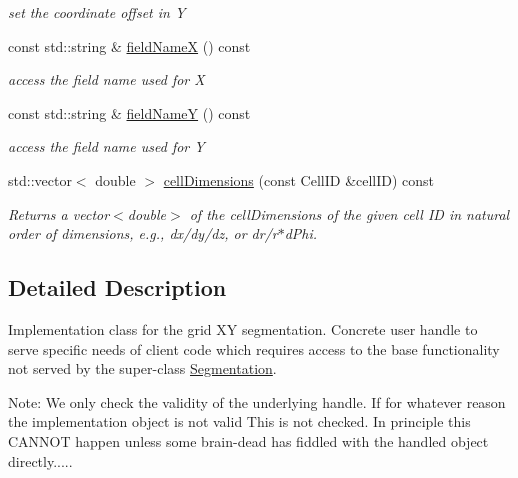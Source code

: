\begin{DoxyCompactItemize}
\begin{DoxyCompactList}\small\item\em set the coordinate offset in Y \item\end{DoxyCompactList}\item 
const std::string \& \hyperlink{class_d_d4hep_1_1_geometry_1_1_cartesian_grid_x_y_aa112adb69e3956f7a576f0de3267b499}{fieldNameX} () const 
\begin{DoxyCompactList}\small\item\em access the field name used for X \item\end{DoxyCompactList}\item 
const std::string \& \hyperlink{class_d_d4hep_1_1_geometry_1_1_cartesian_grid_x_y_a6599c502c4e9628911615308e4581f1c}{fieldNameY} () const 
\begin{DoxyCompactList}\small\item\em access the field name used for Y \item\end{DoxyCompactList}\item 
std::vector$<$ double $>$ \hyperlink{class_d_d4hep_1_1_geometry_1_1_cartesian_grid_x_y_a2f04ec459749d9b0498fbf4601d19a20}{cellDimensions} (const CellID \&cellID) const 
\begin{DoxyCompactList}\small\item\em Returns a vector$<$double$>$ of the cellDimensions of the given cell ID in natural order of dimensions, e.g., dx/dy/dz, or dr/r$\ast$dPhi. \item\end{DoxyCompactList}\end{DoxyCompactItemize}


\subsection{Detailed Description}
Implementation class for the grid XY segmentation. Concrete user handle to serve specific needs of client code which requires access to the base functionality not served by the super-\/class \hyperlink{class_d_d4hep_1_1_geometry_1_1_segmentation}{Segmentation}.

Note: We only check the validity of the underlying handle. If for whatever reason the implementation object is not valid This is not checked. In principle this CANNOT happen unless some brain-\/dead has fiddled with the handled object directly.....

